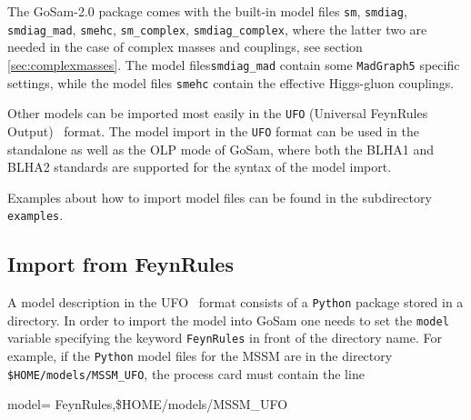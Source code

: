 \documentclass[11pt,a4paper]{refrep}
\newcommand{\gosam}{{\sc GoSam}\xspace}
\begin{document}
The \gosam{}-2.0 package comes with the built-in model files 
{\tt sm}, {\tt smdiag}, {\tt smdiag\_mad}, {\tt smehc}, 
{\tt sm\_complex}, {\tt smdiag\_complex}, 
where the latter two are needed in the case of complex masses and couplings, 
see section \ref{sec:complexmasses}. 
The model files{\tt smdiag\_mad} contain some {\tt MadGraph5} specific settings, while
the model files {\tt smehc}  contain the effective Higgs-gluon couplings.

Other models can be imported most easily in the {\tt UFO} (Universal FeynRules Output)~\cite{Degrande:2011ua} format.
The model import in the {\tt UFO} format can be used in the standalone as well as the OLP 
mode of \gosam, where both the BLHA1 and BLHA2 standards are supported for the syntax of the model import.

Examples about how to import model files can be found in the subdirectory 
 \texttt{examples}.

\subsection{Import from FeynRules}
A model description in the UFO~\cite{Degrande:2011ua} format consists of a \texttt{Python} package
stored in a directory. In order to import the model into \gosam{} one needs
to set the \texttt{model} variable specifying the keyword \texttt{FeynRules}
in front of the directory name.
For example, if the \texttt{Python} model files for the MSSM are in 
 the directory \\
 \texttt{\$HOME/models/MSSM\_UFO}, the process card must contain the line
\begin{example}
model= FeynRules,\$HOME/models/MSSM\_UFO
\end{example}
\end{document}
